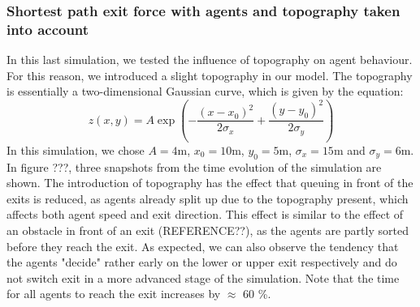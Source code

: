 \documentclass[11pt]{article}
\begin{document}
\subsubsection{Shortest path exit force with agents and topography taken into account}
In this last simulation, we tested the influence of topography on agent behaviour. For this reason, we introduced a slight topography in our model. The topography is essentially a two-dimensional Gaussian curve, which is given by the equation:
\begin{equation}
	z(x,y) = A\exp \left(- \frac{\left(x-x_0\right)^2}{2\sigma_x} + \frac{\left(y-y_0\right)^2}{2\sigma_y}\right)
\end{equation}
In this simulation, we chose $A = 4 $m, $x_0 = 10$m, $y_0 = 5$m, $\sigma_x = 15$m and $\sigma_y = 6$m. In figure ???, three snapshots from the time evolution of the simulation are shown. The introduction of topography has the effect that queuing in front of the exits is reduced, as agents already split up due to the topography present, which affects both agent speed and exit direction. This effect is similar to the effect of an obstacle in front of an exit (REFERENCE??), as the agents are partly sorted before they reach the exit. As expected, we can also observe the tendency that the agents "decide" rather early on the lower or upper exit respectively and do not switch exit in a more advanced stage of the simulation. Note that the time for all agents to reach the exit increases by $\approx$ 60 \%.
\end{document}
